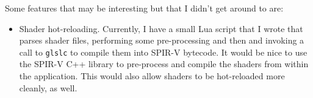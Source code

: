 \documentclass[8pt]{article}
\begin{document}
\begin{multicols}{2}
			Some features that may be interesting but that I didn't get around
			to are:
				\begin{itemize}
					\item Shader hot-reloading. Currently, I have a small Lua
						script that I wrote that parses shader files, performing
						some pre-processing and then and invoking a call to
						\texttt{glslc} to compile them into SPIR-V bytecode.
						It would be nice to use the SPIR-V C++ library to
						pre-process and compile the shaders from within the
						application. This would also allow shaders to be
						hot-reloaded more cleanly, as well.
				\end{itemize}
		\end{multicols}
\end{document}

